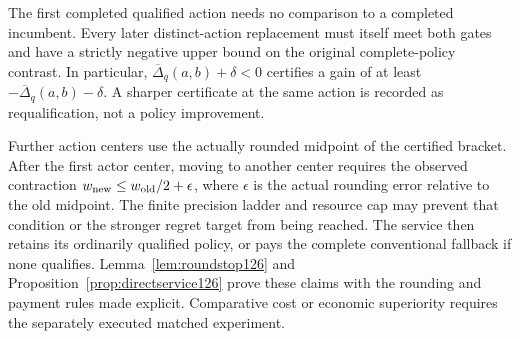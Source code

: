 The first completed qualified action needs no comparison to a completed
incumbent.  Every later distinct-action replacement must itself meet
both gates and have a strictly negative upper bound on the original
complete-policy contrast.  In particular,
$\overline\Delta_q(a,b)+\delta<0$ certifies a gain of at least
$-\overline\Delta_q(a,b)-\delta$.  A sharper certificate at the same
action is recorded as requalification, not a policy improvement.

Further action centers use the actually rounded midpoint of the
certified bracket.  After the first actor center, moving to another
center requires the observed contraction
$w_{\rm new}\le w_{\rm old}/2+\epsilon$, where $\epsilon$ is the
actual rounding error relative to the old midpoint.  The finite
precision ladder and resource cap may prevent that condition or the
stronger regret target from being reached.  The service then retains
its ordinarily qualified policy, or pays the complete conventional
fallback if none qualifies.  Lemma~\ref{lem:roundstop126} and
Proposition~\ref{prop:directservice126} prove these claims with the
rounding and payment rules made explicit.  Comparative cost or economic
superiority requires the separately executed matched experiment.
